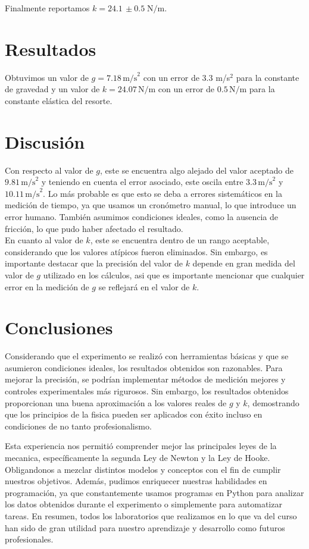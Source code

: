 \documentclass{article}
\begin{document}
Finalmente reportamos $k = 24.1 \, \pm 0.5 \; \text{N/m}$. \\

\section*{Resultados}
Obtuvimos un valor de $g = 7.18 \, \text{m/s}^2$ con un error de $3.3$ m/s$^2$
para la constante de gravedad y un valor de $k = 24.07 \,
\text{N/m}$ con un error de $0.5 \, \text{N/m}$ para la constante elástica 
del resorte.

\section*{Discusión}
Con respecto al valor de $g$, este se encuentra algo alejado del 
valor aceptado de $9.81 \,\text{m/s}^2$ y teniendo en cuenta el error asociado,
este oscila entre $3.3 \,\text{m/s}^2$ y $10.11 \,\text{m/s}^2$. Lo más probable
es que esto se deba a errores sistemáticos en la medición
de tiempo, ya que usamos un cronómetro manual, lo que introduce un error
humano. También asumimos condiciones ideales, como la ausencia de fricción,
lo que pudo haber afectado el resultado. \\

En cuanto al valor de $k$, este se encuentra dentro de un rango aceptable,
considerando que los valores atípicos fueron eliminados. Sin embargo,
es importante destacar que la precisión del valor de $k$ depende en gran
medida del valor de $g$ utilizado en los cálculos, asi que es importante 
mencionar que cualquier error en la medición de $g$ se reflejará en el valor 
de $k$.
 

\section*{Conclusiones}
Considerando que el experimento se realizó con herramientas básicas y
que se asumieron condiciones ideales, los resultados obtenidos son
razonables. Para mejorar la precisión, se podrían implementar
métodos de medición mejores y controles experimentales más rigurosos.
Sin embargo, los resultados obtenidos proporcionan una buena aproximación
a los valores reales de $g$ y $k$, demostrando que los principios 
de la fisica pueden ser aplicados con éxito incluso en condiciones 
de no tanto profesionalismo.

Esta experiencia nos permitió comprender mejor las principales leyes 
de la mecanica, específicamente la segunda Ley de Newton y la Ley de Hooke.
Obligandonos a mezclar distintos modelos y conceptos con el fin de cumplir
nuestros objetivos.
Además, pudimos enriquecer nuestras habilidades en programación, ya que
constantemente usamos programas en Python para analizar los datos obtenidos
durante el experimento o simplemente para automatizar tareas. En resumen, 
todos los laboratorios que realizamos en lo que va del curso han sido de 
gran utilidad para nuestro aprendizaje y desarrollo como futuros 
profesionales.
\vspace{1.3cm}
\end{document}
